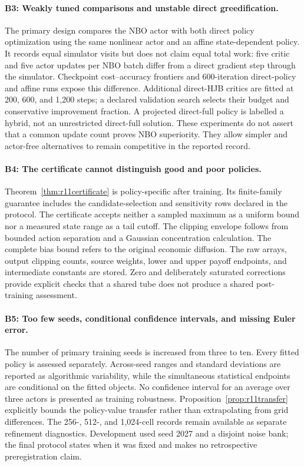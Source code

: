 \paragraph{B3: Weakly tuned comparisons and unstable direct greedification.}
The primary design compares the NBO actor with both direct policy optimization using the same nonlinear actor and an affine state-dependent policy. It records equal simulator visits but does not claim equal total work: five critic and five actor updates per NBO batch differ from a direct gradient step through the simulator. Checkpoint cost--accuracy frontiers and 600-iteration direct-policy and affine runs expose this difference. Additional direct-HJB critics are fitted at 200, 600, and 1,200 steps; a declared validation search selects their budget and conservative improvement fraction. A projected direct-full policy is labelled a hybrid, not an unrestricted direct-full solution. These experiments do not assert that a common update count proves NBO superiority. They allow simpler and actor-free alternatives to remain competitive in the reported record.

\paragraph{B4: The certificate cannot distinguish good and poor policies.}
Theorem~\ref{thm:r11certificate} is policy-specific after training. Its finite-family guarantee includes the candidate-selection and sensitivity rows declared in the protocol. The certificate accepts neither a sampled maximum as a uniform bound nor a measured state range as a tail cutoff. The clipping envelope follows from bounded action separation and a Gaussian concentration calculation. The complete bias bound refers to the original economic diffusion. The raw arrays, output clipping counts, source weights, lower and upper payoff endpoints, and intermediate constants are stored. Zero and deliberately saturated corrections provide explicit checks that a shared tube does not produce a shared post-training assessment.

\paragraph{B5: Too few seeds, conditional confidence intervals, and missing Euler error.}
The number of primary training seeds is increased from three to ten. Every fitted policy is assessed separately. Across-seed ranges and standard deviations are reported as algorithmic variability, while the simultaneous statistical endpoints are conditional on the fitted objects. No confidence interval for an average over three actors is presented as training robustness. Proposition~\ref{prop:r11transfer} explicitly bounds the policy-value transfer rather than extrapolating from grid differences. The 256-, 512-, and 1,024-cell records remain available as separate refinement diagnostics. Development used seed 2027 and a disjoint noise bank; the final protocol states when it was fixed and makes no retrospective preregistration claim.

